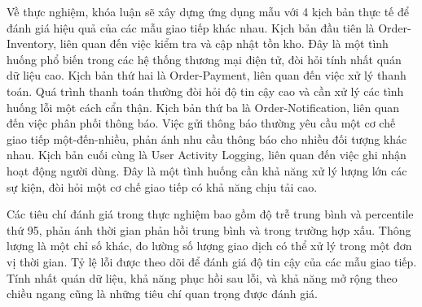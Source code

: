Về thực nghiệm, khóa luận sẽ xây dựng ứng dụng mẫu với 4 kịch bản thực tế để đánh giá hiệu quả của các mẫu giao tiếp khác nhau. Kịch bản đầu tiên là Order-Inventory, liên quan đến việc kiểm tra và cập nhật tồn kho. Đây là một tình huống phổ biến trong các hệ thống thương mại điện tử, đòi hỏi tính nhất quán dữ liệu cao. Kịch bản thứ hai là Order-Payment, liên quan đến việc xử lý thanh toán. Quá trình thanh toán thường đòi hỏi độ tin cậy cao và cần xử lý các tình huống lỗi một cách cẩn thận. Kịch bản thứ ba là Order-Notification, liên quan đến việc phân phối thông báo. Việc gửi thông báo thường yêu cầu một cơ chế giao tiếp một-đến-nhiều, phản ánh nhu cầu thông báo cho nhiều đối tượng khác nhau. Kịch bản cuối cùng là User Activity Logging, liên quan đến việc ghi nhận hoạt động người dùng. Đây là một tình huống cần khả năng xử lý lượng lớn các sự kiện, đòi hỏi một cơ chế giao tiếp có khả năng chịu tải cao.

Các tiêu chí đánh giá trong thực nghiệm bao gồm độ trễ trung bình và percentile thứ 95, phản ánh thời gian phản hồi trung bình và trong trường hợp xấu. Thông lượng là một chỉ số khác, đo lường số lượng giao dịch có thể xử lý trong một đơn vị thời gian. Tỷ lệ lỗi được theo dõi để đánh giá độ tin cậy của các mẫu giao tiếp. Tính nhất quán dữ liệu, khả năng phục hồi sau lỗi, và khả năng mở rộng theo chiều ngang cũng là những tiêu chí quan trọng được đánh giá. 